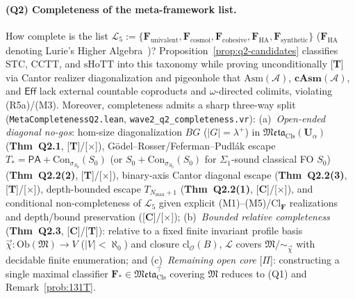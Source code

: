 \documentclass[11pt]{article}
\theoremstyle{plain}
\theoremstyle{definition}
\newcommand{\fM}{\mathfrak{M}}
\newcommand{\Meta}{\mathfrak{Meta}}
\newcommand{\Ob}{\mathrm{Ob}}
\newcommand{\Cl}{\mathrm{Cl}}
\newcommand{\Con}{\mathrm{Con}}
\newcommand{\PA}{\mathsf{PA}}
\newcommand{\Eff}{\ensuremath{\mathsf{Eff}}}
\begin{document}
\paragraph{(Q2) Completeness of the meta-framework list.} How complete is the list $\mathcal{L}_5 := \{\mathbf{F}_{\mathrm{univalent}},\allowbreak \mathbf{F}_{\mathrm{cosmoi}},\allowbreak \mathbf{F}_{\mathrm{cohesive}},\allowbreak \mathbf{F}_{\mathrm{HA}},\allowbreak \mathbf{F}_{\mathrm{synthetic}}\}$ ($\mathbf{F}_{\mathrm{HA}}$ denoting Lurie's Higher Algebra~\cite{LurieHA})? Proposition~\ref{prop:q2-candidates} classifies STC, CCTT, and $\mathrm{sHoTT}$ into this taxonomy while proving unconditionally \textup{[\textbf{T}]} via Cantor realizer diagonalization and pigeonhole that $\mathrm{Asm}(\mathcal{A})$, $\mathbf{cAsm}(\mathcal{A})$, and $\Eff$ lack external countable coproducts and $\omega$-directed colimits, violating (R5a)/(M3). Moreover, completeness admits a sharp three-way split (\texttt{MetaCompletenessQ2.lean}, \texttt{wave2\_q2\_completeness.vr}): (a)~\emph{Open-ended diagonal no-gos}: hom-size diagonalization $BG$ ($|G|=\lambda^+$) in $\Meta_{\mathrm{Cls}}(\mathbf{U}_\alpha)$ (\textup{\textbf{Thm~Q2.1}}, \textup{[\textbf{T}]/[\textbf{$\times$}]}), G\"odel--Rosser/Feferman--Pudl\'ak escape $T_* = \PA + \Con_{\sigma_{S_0}}(S_0)$ (or $S_0 + \Con_{\sigma_{S_0}}(S_0)$ for $\Sigma_1$-sound classical FO $S_0$) (\textup{\textbf{Thm~Q2.2(2)}}, \textup{[\textbf{T}]/[\textbf{$\times$}]}), binary-axis Cantor diagonal escape (\textup{\textbf{Thm~Q2.2(3)}}, \textup{[\textbf{T}]/[\textbf{$\times$}]}), depth-bounded escape $T_{N_{\max}+1}$ (\textup{\textbf{Thm~Q2.2(1)}}, \textup{[\textbf{C}]/[\textbf{$\times$}]}), and conditional non-completeness of $\mathcal{L}_5$ given explicit (M1)--(M5)/$\Cl_{\mathbf{F}}$ realizations and depth/bound preservation (\textup{[\textbf{C}]/[\textbf{$\times$}]}); (b)~\emph{Bounded relative completeness} (\textup{\textbf{Thm~Q2.3}}, \textup{[\textbf{C}]/[\textbf{T}]}): relative to a fixed finite invariant profile basis $\vec{\chi} : \Ob(\fM) \to V$ ($|V| < \aleph_0$) and closure $\mathrm{cl}_{\mathcal{O}}(B)$, $\mathcal{L}$ covers $\fM / {\sim_{\vec{\chi}}}$ with decidable finite enumeration; and (c)~\emph{Remaining open core} \textup{[\textbf{$\Pi$}]}: constructing a single maximal classifier $\mathbf{F}_* \in \Meta_{\mathrm{Cls}}^{\top}$ covering $\fM$ reduces to (Q1) and Remark~\ref{prob:131T}.
\end{document}
